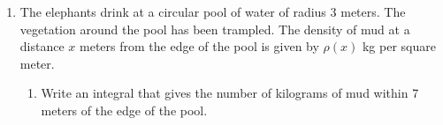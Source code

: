 \documentclass{article}
\begin{document}
\begin{enumerate}
\begin{enumerate}
\begin{enumerate}
\begin{solution}
        The width of the slice is (right $t$-coordinate) $-$ (left
        $t$-coordinate); the right $t$-coordinate is 1.  The left
        $t$-coordinate is on the curve $y = \arcsin t$ (which can be
        rewritten as $t = \sin y$), so it is $\sin y_k$.  So,
        \begin{align*}
          \text{area of the $k$-th slice} & \approx \text{(width of slice)
            (height of slice)} \\
          & \approx [1-\sin(y_k)] \Delta y
        \end{align*}
        Summing over all slices and taking the limit as the number of slices
        $\to \infty$, the area of the region is 
        \begin{align*}
          \int_0^{\pi / 2} (1 - \sin y)\,dy & = y + \cos y \Big|_0^{\pi/2} \\
          & = \boxed{\frac{\pi}{2} - 1}
        \end{align*}
        So, the distance traveled is $\frac{\pi}{2} - 1$ miles. 
      \end{solution}
    \end{enumerate}

  \item 


    The elephants drink at a circular pool of water of radius 3 meters.
    The vegetation around the pool has been trampled.  The density of mud
    at a distance $x$ meters from the edge of the pool is given by
    $\rho(x)$ kg per square meter.

    \begin{enumerate}
    \item 
      \begin{problem}[\stretch{1.5}]
        Write an integral that gives the number of kilograms of mud within
        7 meters of the edge of the pool.
      \end{problem}


\end{enumerate}
\end{enumerate}
\end{enumerate}
\end{document}
